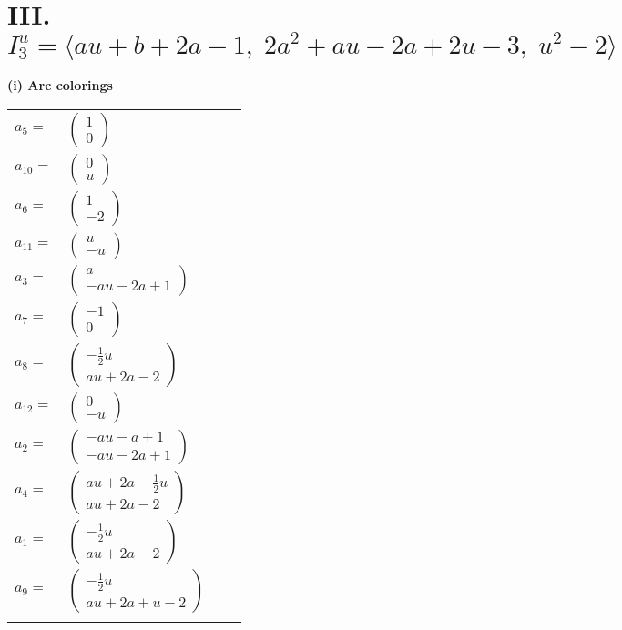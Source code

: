 \documentclass[1p]{elsarticle_modified}
\theoremstyle{definition}
\begin{document}
\centering \section*{III. $I^u_{3}= \langle a u+b+2 a-1,\;2 a^2+a u-2 a+2 u-3,\;u^2-2 \rangle$}
\flushleft \textbf{(i) Arc colorings}\\
\begin{tabular}{m{7pt} m{180pt} m{7pt} m{180pt} }
\flushright $a_{5}=$&$\begin{pmatrix}1\\0\end{pmatrix}$ \\
\flushright $a_{10}=$&$\begin{pmatrix}0\\u\end{pmatrix}$ \\
\flushright $a_{6}=$&$\begin{pmatrix}1\\-2\end{pmatrix}$ \\
\flushright $a_{11}=$&$\begin{pmatrix}u\\- u\end{pmatrix}$ \\
\flushright $a_{3}=$&$\begin{pmatrix}a\\- a u-2 a+1\end{pmatrix}$ \\
\flushright $a_{7}=$&$\begin{pmatrix}-1\\0\end{pmatrix}$ \\
\flushright $a_{8}=$&$\begin{pmatrix}-\frac{1}{2} u\\a u+2 a-2\end{pmatrix}$ \\
\flushright $a_{12}=$&$\begin{pmatrix}0\\- u\end{pmatrix}$ \\
\flushright $a_{2}=$&$\begin{pmatrix}- a u- a+1\\- a u-2 a+1\end{pmatrix}$ \\
\flushright $a_{4}=$&$\begin{pmatrix}a u+2 a-\frac{1}{2} u\\a u+2 a-2\end{pmatrix}$ \\
\flushright $a_{1}=$&$\begin{pmatrix}-\frac{1}{2} u\\a u+2 a-2\end{pmatrix}$ \\
\flushright $a_{9}=$&$\begin{pmatrix}-\frac{1}{2} u\\a u+2 a+u-2\end{pmatrix}$\\&\end{tabular}
\end{document}
